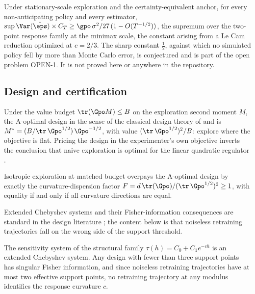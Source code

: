 \begin{theorem}
\label{thm:t4}
Under stationary-scale exploration and the certainty-equivalent anchor, for
every non-anticipating policy and every estimator,
$\sup \Var(\hat\eps)\times C_T \ge \gpo\,\sigma^2/27\,(1 - O(T^{-1/2}))$,
the supremum over the two-point response family at the minimax scale, the
constant arising from a Le Cam reduction optimized at $c = 2/3$. The sharp
constant $\tfrac{1}{2}$, against which no simulated policy fell by more than
Monte Carlo error, is conjectured and is part of the open problem OPEN-1. It
is not proved here or anywhere in the repository.
\end{theorem}

\subsection{Design and certification}

\begin{theorem}
\label{thm:t5a}
Under the value budget $\tr(\Gpo M) \le B$ on the exploration second moment
$M$, the A-optimal design in the sense of the classical design theory of
\citet{kiefer1960equivalence} and \citet{pukelsheim2006optimal} is
$M^{*} = (B/\tr\,\Gpo^{1/2})\,\Gpo^{-1/2}$, with value
$(\tr\,\Gpo^{1/2})^2/B$: explore where the objective is flat. Pricing the
design in the experimenter's own objective inverts the conclusion that naive
exploration is optimal for the linear quadratic regulator
\citep{simchowitz2020naive,wagenmaker2021task}.
\end{theorem}

\begin{corollary}
\label{cor:c51}
Isotropic exploration at matched budget overpays the A-optimal design by
exactly the curvature-dispersion factor
$F = d\,\tr(\Gpo)/(\tr\,\Gpo^{1/2})^2 \ge 1$, with equality if and only if
all curvature directions are equal.
\end{corollary}

Extended Chebyshev systems and their Fisher-information consequences are
standard in the design literature \citep{pukelsheim2006optimal}; the content
below is that noiseless retraining trajectories fall on the wrong side of the
support threshold.

\begin{theorem}
\label{thm:t6}
The sensitivity system of the structural family
$\tau(h) = C_0 + C_1 e^{-ch}$ is an extended Chebyshev system. Any design
with fewer than three support points has singular Fisher information, and
since noiseless retraining trajectories have at most two effective support
points, no retraining trajectory at any modulus identifies the response
curvature $c$.
\end{theorem}

